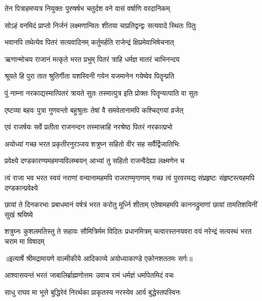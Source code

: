 \twolineshloka
{तेन पित्राहमप्यत्र नियुक्तः पुरुषर्षभ}
{चतुर्दश वने वासं वर्षाणि वरदानिकम्} %

\twolineshloka
{सोऽहं वनमिदं प्राप्तो निर्जनं लक्ष्मणान्वितः}
{शीतया चाप्रतिद्वन्द्वः सत्यवादे स्थितः पितुः} %

\twolineshloka
{भवानपि तथेत्येव पितरं सत्यवादिनम्}
{कर्तुमर्हति राजेन्द्रं क्षिप्रमेवाभिषेचनात्} %

\twolineshloka
{ऋणान्मोचय राजानं मत्कृते भरत प्रभुम्}
{पितरं त्राहि धर्मज्ञ मातरं चाभिनन्दय} %

\twolineshloka
{श्रूयते हि पुरा तात श्रुतिर्गीता यशस्विनी}
{गयेन यजमानेन गयेष्वेव पितॄन्प्रति} %

\twolineshloka
{पुं नाम्ना नरकाद्यस्मात्पितरं त्रायते सुतः}
{तस्मात्पुत्र इति प्रोक्तः पितॄन्यत्पाति वा सुतः} %

\twolineshloka
{एष्टव्या बहवः पुत्रा गुणवन्तो बहुश्रुताः}
{तेषां वै समवेतानामपि कश्चिद्गयां व्रजेत्} %

\twolineshloka
{एवं राजर्षयः सर्वे प्रतीता राजनन्दन}
{तस्मात्त्राहि नरश्रेष्ठ पितरं नरकात्प्रभो} %

\twolineshloka
{अयोध्यां गच्छ भरत प्रकृतीरनुरञ्जय}
{शत्रुघ्न सहितो वीर सह सर्वैर्द्विजातिभिः} %

\twolineshloka
{प्रवेक्ष्ये दण्डकारण्यमहमप्यविलम्बयन्}
{आभ्यां तु सहितो राजन्वैदेह्या लक्ष्मणेन च} %

\fourlineindentedshloka
{त्वं राजा भव भरत स्वयं नराणां}
{ वन्यानामहमपि राजराण्मृगाणाम्}
{गच्छ त्वं पुरवरमद्य संप्रहृष्टः}
{ संहृष्टस्त्वहमपि दण्डकान्प्रवेक्ष्ये} %

\fourlineindentedshloka
{छायां ते दिनकरभाः प्रबाधमानं}
{ वर्षत्रं भरत करोतु मूर्ध्नि शीताम्}
{एतेषामहमपि काननद्रुमाणां}
{ छायां तामतिशयिनीं सुखं श्रयिष्ये} %

\fourlineindentedshloka
{शत्रुघ्नः कुशलमतिस्तु ते सहायः}
{ सौमित्रिर्मम विदितः प्रधानमित्रम्}
{चत्वारस्तनयवरा वयं नरेन्द्रं}
{ सत्यस्थं भरत चराम मा विषादम्} %


{॥इत्यार्षे श्रीमद्रामायणे वाल्मीकीये आदिकाव्ये अयोध्याकाण्डे एकोनशततमः सर्गः॥}


\twolineshloka
{आश्वासयन्तं भरतं जाबालिर्ब्राह्मणोत्तमः}
{उवाच रामं धर्मज्ञं धर्मापेतमिदं वचः} %

\twolineshloka
{साधु राघव मा भूत्ते बुद्धिरेवं निरर्थका}
{प्राकृतस्य नरस्येव आर्य बुद्धेस्तपस्विनः} %

